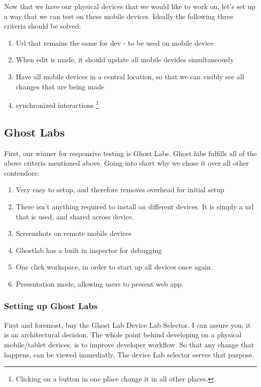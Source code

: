Now that we have our physical devices that we would like to work on, let's set
up a way that we can test on these mobile devices. Ideally the following three
criteria should be solved:
\begin{enumerate}
  \item Url that remains the same for dev - to be used on mobile device
  \item When edit is made, it should update all mobile devides simultaneously
  \item Have all mobile devices in a central location, so that we can visibly
  see all changes that are being made
  \item synchronized interactions \footnote{Clicking on a button in one place
  change it in all other places.}
\end{enumerate}

\subsection{ Ghost Labs }

First, our winner for responsive testing is Ghost Labs. Ghost labs fulfills all
of the above criteria mentioned above. Going into short why we chose it over
all other contendors:
\begin{enumerate}
  \item Very easy to setup, and therefore removes overhead for initial setup
  \item There isn't anything required to install on different devices. It is
  simply a url that is used, and shared across device.
  \item Screenshots on remote mobile devices
  \item Ghostlab has a built in inspector for debugging
  \item One click workspace, in order to start up all devices once again.
  \item Presentation mode, allowing users to present web app.
\end{enumerate}

\subsubsection{ Setting up Ghost Labs }
First and foremost, buy the Ghost Lab Device Lab Selector. I can assure you, it
is an architectural decision. The whole point behind developing on a physical
mobile/tablet devices, is to improve developer workflow. So that any change that
happens, can be viewed immediatly. The device Lab selector serves that purpose.


